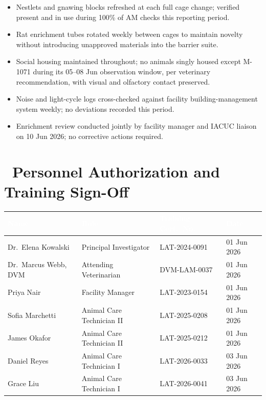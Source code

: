 \documentclass[11pt]{scrreprt}
\begin{document}
\begin{infobox}
\begin{itemize}
\item Nestlets and gnawing blocks refreshed at each full cage change; verified present
  and in use during 100\% of AM checks this reporting period.
\item Rat enrichment tubes rotated weekly between cages to maintain novelty without
  introducing unapproved materials into the barrier suite.
\item Social housing maintained throughout; no animals singly housed except M-1071
  during its 05--08 Jun observation window, per veterinary recommendation, with
  visual and olfactory contact preserved.
\item Noise and light-cycle logs cross-checked against facility building-management
  system weekly; no deviations recorded this period.
\item Enrichment review conducted jointly by facility manager and IACUC liaison on
  10 Jun 2026; no corrective actions required.
\end{itemize}
\end{infobox}

\section*{\faPen\ Personnel Authorization and Training Sign-Off}

\begin{footnotesize}
\begin{tabularx}{\textwidth}{@{}X l l l@{}}
\toprule
\rowcolor{vivteal}
\textcolor{white}{\textbf{Name}} & \textcolor{white}{\textbf{Role}} &
\textcolor{white}{\textbf{Training Cert.\ No.}} & \textcolor{white}{\textbf{Date}} \\
\midrule
Dr.\ Elena Kowalski & Principal Investigator & LAT-2024-0091 & 01 Jun 2026 \\
Dr.\ Marcus Webb, DVM & Attending Veterinarian & DVM-LAM-0037 & 01 Jun 2026 \\
Priya Nair & Facility Manager & LAT-2023-0154 & 01 Jun 2026 \\
Sofia Marchetti & Animal Care Technician II & LAT-2025-0208 & 01 Jun 2026 \\
James Okafor & Animal Care Technician II & LAT-2025-0212 & 01 Jun 2026 \\
Daniel Reyes & Animal Care Technician I & LAT-2026-0033 & 03 Jun 2026 \\
Grace Liu & Animal Care Technician I & LAT-2026-0041 & 03 Jun 2026 \\
\bottomrule
\end{tabularx}
\end{footnotesize}
\end{document}
